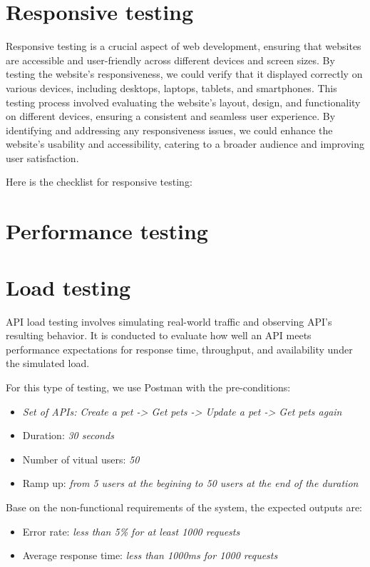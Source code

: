 



\section{Responsive testing}
Responsive testing is a crucial aspect of web development, ensuring that
websites are accessible and user-friendly across different devices and
screen sizes. By testing the website's responsiveness, we could verify
that it displayed correctly on various devices, including desktops,
laptops, tablets, and smartphones. This testing process involved
evaluating the website's layout, design, and functionality on different
devices, ensuring a consistent and seamless user experience. By
identifying and addressing any responsiveness issues, we could enhance
the website's usability and accessibility, catering to a broader audience
and improving user satisfaction.

Here is the checklist for responsive testing:


\section{Performance testing}

\section{Load testing}
API load testing involves simulating real-world traffic and observing API’s resulting behavior. It is conducted to evaluate how well an API meets performance expectations for response time, throughput, and availability under the simulated load.

For this type of testing, we use Postman with the pre-conditions:
\begin{itemize}
  \item \textit{Set of APIs: Create a pet -> Get pets -> Update a pet -> Get pets again}
  \item Duration: \textit{30 seconds}
  \item Number of vitual users: \textit{50}
  \item Ramp up: \textit{from 5 users at the begining to 50 users at the end of the duration}
\end{itemize}

Base on the non-functional requirements of the system, the expected outputs are:
\begin{itemize}
  \item Error rate: \textit{less than 5\% for at least 1000 requests}
  \item Average response time: \textit{less than 1000ms for 1000 requests}
\end{itemize}

